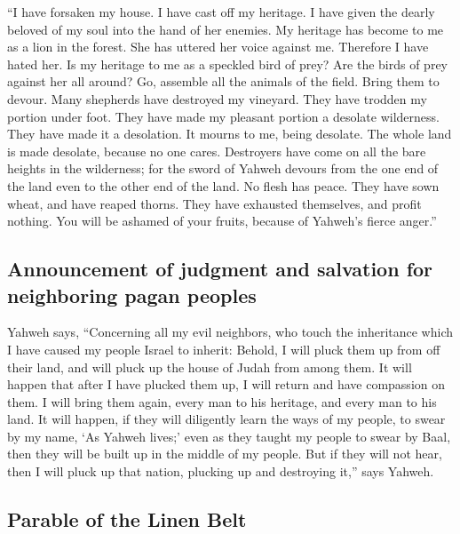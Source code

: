 ``I have forsaken my house. I have cast off my heritage.
I have given the dearly beloved of my soul into the hand of her enemies.
 My heritage has become to me as a lion in the forest. She
has uttered her voice against me. Therefore I have hated her.
 Is my heritage to me as a speckled bird of prey? Are the
birds of prey against her all around? Go, assemble all the animals of
the field. Bring them to devour.  Many shepherds have
destroyed my vineyard. They have trodden my portion under foot. They
have made my pleasant portion a desolate wilderness. 
They have made it a desolation. It mourns to me, being desolate. The
whole land is made desolate, because no one cares. 
Destroyers have come on all the bare heights in the wilderness; for the
sword of Yahweh devours from the one end of the land even to the other
end of the land. No flesh has peace.  They have sown
wheat, and have reaped thorns. They have exhausted themselves, and
profit nothing. You will be ashamed of your fruits, because of Yahweh's
fierce anger.''

\hypertarget{announcement-of-judgment-and-salvation-for-neighboring-pagan-peoples}{%
\subsection{Announcement of judgment and salvation for neighboring pagan
peoples}\label{announcement-of-judgment-and-salvation-for-neighboring-pagan-peoples}}

 Yahweh says, ``Concerning all my evil neighbors, who
touch the inheritance which I have caused my people Israel to inherit:
Behold, I will pluck them up from off their land, and will pluck up the
house of Judah from among them.  It will happen that
after I have plucked them up, I will return and have compassion on them.
I will bring them again, every man to his heritage, and every man to his
land.  It will happen, if they will diligently learn the
ways of my people, to swear by my name, `As Yahweh lives;' even as they
taught my people to swear by Baal, then they will be built up in the
middle of my people.  But if they will not hear, then I
will pluck up that nation, plucking up and destroying it,'' says Yahweh.

\hypertarget{parable-of-the-linen-belt}{%
\subsection{Parable of the Linen Belt}\label{parable-of-the-linen-belt}}

